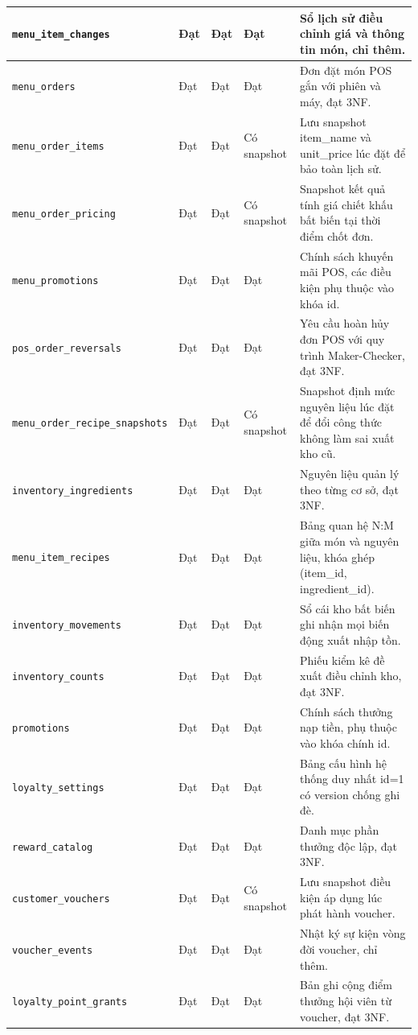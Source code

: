 \begin{table}[htbp]
\begin{tabularx}{\textwidth}{|>{\raggedright\arraybackslash}p{3.2cm}|>{\centering\arraybackslash}p{1.0cm}|>{\centering\arraybackslash}p{1.0cm}|>{\centering\arraybackslash}p{1.6cm}|X|}
\hline
\texttt{menu\_item\_changes} & Đạt & Đạt & Đạt & Sổ lịch sử điều chỉnh giá và thông tin món, chỉ thêm. \\
\hline
\texttt{menu\_orders} & Đạt & Đạt & Đạt & Đơn đặt món POS gắn với phiên và máy, đạt 3NF. \\
\hline
\texttt{menu\_order\_items} & Đạt & Đạt & Có snapshot & Lưu snapshot item_name và unit_price lúc đặt để bảo toàn lịch sử. \\
\hline
\texttt{menu\_order\_pricing} & Đạt & Đạt & Có snapshot & Snapshot kết quả tính giá chiết khấu bất biến tại thời điểm chốt đơn. \\
\hline
\texttt{menu\_promotions} & Đạt & Đạt & Đạt & Chính sách khuyến mãi POS, các điều kiện phụ thuộc vào khóa id. \\
\hline
\texttt{pos\_order\_reversals} & Đạt & Đạt & Đạt & Yêu cầu hoàn hủy đơn POS với quy trình Maker-Checker, đạt 3NF. \\
\hline
\texttt{menu\_order\_recipe\_snapshots} & Đạt & Đạt & Có snapshot & Snapshot định mức nguyên liệu lúc đặt để đổi công thức không làm sai xuất kho cũ. \\
\hline
\texttt{inventory\_ingredients} & Đạt & Đạt & Đạt & Nguyên liệu quản lý theo từng cơ sở, đạt 3NF. \\
\hline
\texttt{menu\_item\_recipes} & Đạt & Đạt & Đạt & Bảng quan hệ N:M giữa món và nguyên liệu, khóa ghép (item_id, ingredient_id). \\
\hline
\texttt{inventory\_movements} & Đạt & Đạt & Đạt & Sổ cái kho bất biến ghi nhận mọi biến động xuất nhập tồn. \\
\hline
\texttt{inventory\_counts} & Đạt & Đạt & Đạt & Phiếu kiểm kê đề xuất điều chỉnh kho, đạt 3NF. \\
\hline
\texttt{promotions} & Đạt & Đạt & Đạt & Chính sách thưởng nạp tiền, phụ thuộc vào khóa chính id. \\
\hline
\texttt{loyalty\_settings} & Đạt & Đạt & Đạt & Bảng cấu hình hệ thống duy nhất id=1 có version chống ghi đè. \\
\hline
\texttt{reward\_catalog} & Đạt & Đạt & Đạt & Danh mục phần thưởng độc lập, đạt 3NF. \\
\hline
\texttt{customer\_vouchers} & Đạt & Đạt & Có snapshot & Lưu snapshot điều kiện áp dụng lúc phát hành voucher. \\
\hline
\texttt{voucher\_events} & Đạt & Đạt & Đạt & Nhật ký sự kiện vòng đời voucher, chỉ thêm. \\
\hline
\texttt{loyalty\_point\_grants} & Đạt & Đạt & Đạt & Bản ghi cộng điểm thưởng hội viên từ voucher, đạt 3NF. \\

\end{tabularx}
\end{table}
